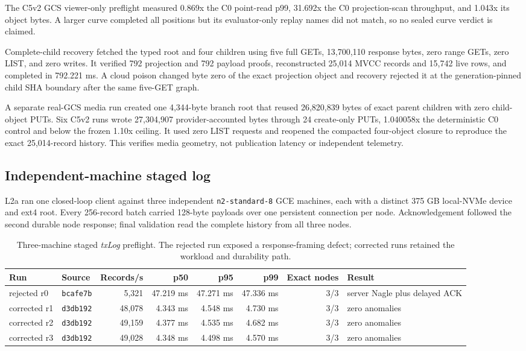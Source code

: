 \documentclass[sigconf,nonacm]{acmart}
\newcommand{\txlog}{\textit{txLog}}
\begin{document}
The C5v2 GCS viewer-only preflight measured 0.869x the C0 point-read p99,
31.692x the C0 projection-scan throughput, and 1.043x its object bytes. A larger
curve completed all positions but its evaluator-only replay names did not match,
so no sealed curve verdict is claimed.

Complete-child recovery fetched the typed root and four children using five full
GETs, 13,700,110 response bytes, zero range GETs, zero LIST, and zero writes. It
verified 792 projection and 792 payload proofs, reconstructed 25,014 MVCC records
and 15,742 live rows, and completed in 792.221 ms. A cloud poison changed byte
zero of the exact projection object and recovery rejected it at the
generation-pinned child SHA boundary after the same five-GET graph.

A separate real-GCS media run created one 4,344-byte branch root that reused
26,820,839 bytes of exact parent children with zero child-object PUTs. Six C5v2
runs wrote 27,304,907 provider-accounted bytes through 24 create-only PUTs,
1.040058x the deterministic C0 control and below the frozen 1.10x ceiling. It
used zero LIST requests and reopened the compacted four-object closure to
reproduce the exact 25,014-record history. This verifies media geometry, not
publication latency or independent telemetry.

\subsection{Independent-machine staged log}

L2a ran one closed-loop client against three independent
\texttt{n2-standard-8} GCE machines, each with a distinct 375 GB local-NVMe
device and ext4 root. Every 256-record batch carried 128-byte payloads over one
persistent connection per node. Acknowledgement followed the second durable
node response; final validation read the complete history from all three nodes.

\begin{table}[t]
  \centering
  \small
  \caption{Three-machine staged \txlog{} preflight. The rejected run exposed a
  response-framing defect; corrected runs retained the workload and durability
  path.}
  \label{tab:txlogpreflight}
  \begin{tabularx}{\textwidth}{@{}l l r r r r r X@{}}
    \toprule
    Run & Source & Records/s & p50 & p95 & p99 & Exact nodes & Result \\
    \midrule
    rejected r0 & \texttt{bcafe7b} & 5,321 & 47.219 ms & 47.271 ms & 47.336 ms & 3/3 & server Nagle plus delayed ACK \\
    corrected r1 & \texttt{d3db192} & 48,078 & 4.343 ms & 4.548 ms & 4.730 ms & 3/3 & zero anomalies \\
    corrected r2 & \texttt{d3db192} & 49,159 & 4.377 ms & 4.535 ms & 4.682 ms & 3/3 & zero anomalies \\
    corrected r3 & \texttt{d3db192} & 49,028 & 4.348 ms & 4.498 ms & 4.570 ms & 3/3 & zero anomalies \\
    \bottomrule
  \end{tabularx}
\end{table}
\end{document}
